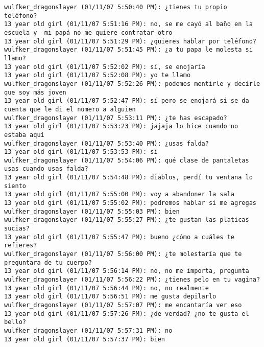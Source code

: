 \begin{verbatim}
wulfker_dragonslayer (01/11/07 5:50:40 PM): ¿tienes tu propio teléfono?
13 year old girl (01/11/07 5:51:16 PM): no, se me cayó al baño en la escuela y  mi papá no me quiere contratar otro
13 year old girl (01/11/07 5:51:29 PM): ¿quieres hablar por teléfono?
wulfker_dragonslayer (01/11/07 5:51:45 PM): ¿a tu papa le molesta si llamo?
13 year old girl (01/11/07 5:52:02 PM): sí, se enojaría
13 year old girl (01/11/07 5:52:08 PM): yo te llamo
wulfker_dragonslayer (01/11/07 5:52:26 PM): podemos mentirle y decirle que soy más joven
13 year old girl (01/11/07 5:52:47 PM): sí pero se enojará si se da cuenta que le di el numero a alguien
wulfker_dragonslayer (01/11/07 5:53:11 PM): ¿te has escapado?
13 year old girl (01/11/07 5:53:23 PM): jajaja lo hice cuando no estaba aquí
wulfker_dragonslayer (01/11/07 5:53:40 PM): ¿usas falda?
13 year old girl (01/11/07 5:53:53 PM): sí
wulfker_dragonslayer (01/11/07 5:54:06 PM): qué clase de pantaletas usas cuando usas falda?
13 year old girl (01/11/07 5:54:48 PM): diablos, perdí tu ventana lo siento
13 year old girl (01/11/07 5:55:00 PM): voy a abandoner la sala
13 year old girl (01/11/07 5:55:02 PM): podremos hablar si me agregas
wulfker_dragonslayer (01/11/07 5:55:03 PM): bien
wulfker_dragonslayer (01/11/07 5:55:27 PM): ¿te gustan las platicas sucias?
13 year old girl (01/11/07 5:55:47 PM): bueno ¿cómo a cuáles te refieres?
wulfker_dragonslayer (01/11/07 5:56:00 PM): ¿te molestaría que te preguntara de tu cuerpo? 
13 year old girl (01/11/07 5:56:14 PM): no, no me importa, pregunta
wulfker_dragonslayer (01/11/07 5:56:22 PM): ¿tienes pelo en tu vagina?
13 year old girl (01/11/07 5:56:44 PM): no, no realmente
13 year old girl (01/11/07 5:56:51 PM): me gusta depilarlo
wulfker_dragonslayer (01/11/07 5:57:07 PM): me encantaría ver eso 
13 year old girl (01/11/07 5:57:26 PM): ¿de verdad? ¿no te gusta el bello?
wulfker_dragonslayer (01/11/07 5:57:31 PM): no
13 year old girl (01/11/07 5:57:37 PM): bien

\end{verbatim}